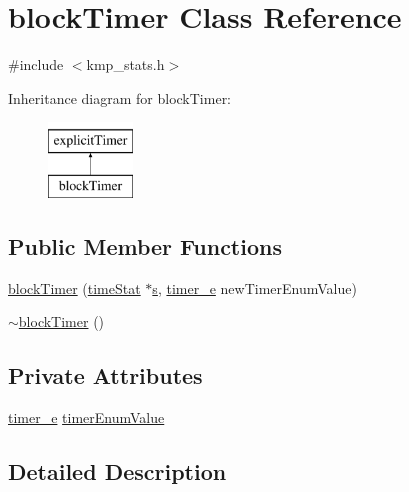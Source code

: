 \hypertarget{classblockTimer}{\section{block\-Timer Class Reference}
\label{classblockTimer}
}


{\ttfamily \#include $<$kmp\-\_\-stats.\-h$>$}

Inheritance diagram for block\-Timer\-:\begin{figure}[H]
\begin{center}
\leavevmode
\includegraphics[height=2.000000cm]{classblockTimer}
\end{center}
\end{figure}
\subsection*{Public Member Functions}
\begin{DoxyCompactItemize}
\item 
\hyperlink{classblockTimer_aa7980b081a494a7d2f5a9c1dbf2eb055}{block\-Timer} (\hyperlink{classtimeStat}{time\-Stat} $\ast$\hyperlink{ittnotify__static_8h_a110bd9ede250f97ce56d81bb3c7b171d}{s}, \hyperlink{kmp__stats_8h_ae03f1e0ff609f86afa9b7167a12c6c06}{timer\-\_\-e} new\-Timer\-Enum\-Value)
\item 
\hyperlink{classblockTimer_a7a1dd10314b77b2dfb1a5712538d90b2}{$\sim$block\-Timer} ()
\end{DoxyCompactItemize}
\subsection*{Private Attributes}
\begin{DoxyCompactItemize}
\item 
\hyperlink{kmp__stats_8h_ae03f1e0ff609f86afa9b7167a12c6c06}{timer\-\_\-e} \hyperlink{classblockTimer_a2d8be4c2338d519b503542e1ddd07060}{timer\-Enum\-Value}
\end{DoxyCompactItemize}


\subsection{Detailed Description}


